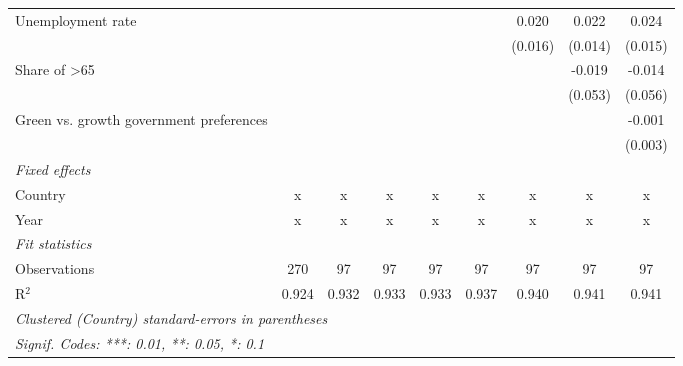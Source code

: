 \begin{table}[htbp]
\begin{tabular}{lcccccccc}
      Unemployment rate                            &         &         &         &         &              & 0.020        & 0.022        & 0.024\\   
                                                   &         &         &         &         &              & (0.016)      & (0.014)      & (0.015)\\   
      Share of >65                                 &         &         &         &         &              &              & -0.019       & -0.014\\   
                                                   &         &         &         &         &              &              & (0.053)      & (0.056)\\   
      Green vs. growth government preferences      &         &         &         &         &              &              &              & -0.001\\   
                                                   &         &         &         &         &              &              &              & (0.003)\\   
      \emph{Fixed effects}\\
      Country                                      & x       & x       & x       & x       & x            & x            & x            & x\\  
      Year                                         & x       & x       & x       & x       & x            & x            & x            & x\\  
      \midrule \emph{Fit statistics}\\
      Observations                                 & 270     & 97      & 97      & 97      & 97           & 97           & 97           & 97\\  
      R$^2$                                        & 0.924   & 0.932   & 0.933   & 0.933   & 0.937        & 0.940        & 0.941        & 0.941\\  
      \midrule
      \multicolumn{9}{l}{\emph{Clustered (Country) standard-errors in parentheses}}\\
      \multicolumn{9}{l}{\emph{Signif. Codes: ***: 0.01, **: 0.05, *: 0.1}}\\
   \end{tabular}
\end{table}


